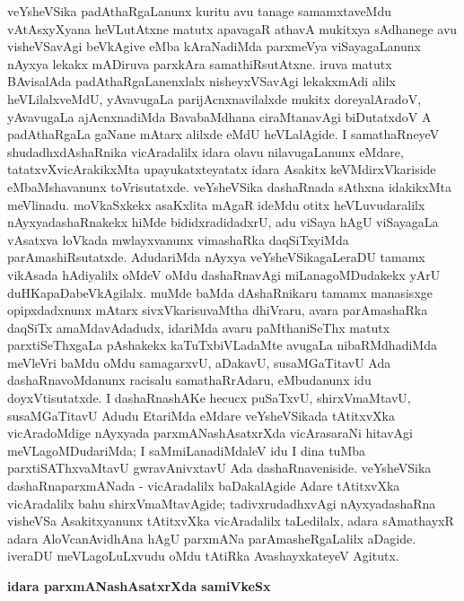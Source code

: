 veYsheVSika padAthaRgaLanunx kuritu avu tanage samamxtaveMdu vAtAsxyXyana heVLutAtxne matutx apavagaR athavA mukitxya sAdhanege avu visheVSavAgi beVkAgive eMba kAraNadiMda parxmeVya viSayagaLanunx nAyxya lekakx mADiruva parxkAra samathiRsutAtxne. iruva matutx BAvisalAda padAthaRgaLanenxlalx nisheyxVSavAgi lekakxmAdi alilx heVLilalxveMdU, yAvavugaLa parijAcnxnavilalxde mukitx doreyalAradoV, yAvavugaLa ajAcnxnadiMda BavabaMdhana ciraMtanavAgi biDutatxdoV A padAthaRgaLa gaNane mAtarx alilxde eMdU heVLalAgide. I samathaRneyeV shudadhxdAshaRnika vicAradalilx idara olavu nilavugaLanunx eMdare, tatatxvXvicArakikxMta upayukatxteyatatx idara Asakitx keVMdirxVkariside eMbaMshavanunx toVrisutatxde. veYsheVSika dashaRnada sAthxna idakikxMta meVlinadu. moVkaSxkekx asaKxlita mAgaR ideMdu otitx heVLuvudaralilx nAyxyadashaRnakekx hiMde bididxradidadxrU, adu viSaya hAgU viSayagaLa vAsatxva loVkada mwlayxvanunx vimashaRka daqSiTxyiMda parAmashiRsutatxde. AdudariMda nAyxya veYsheVSikagaLeraDU tamamx vikAsada hAdiyalilx oMdeV oMdu dashaRnavAgi miLanagoMDudakekx yArU duHKapaDabeVkAgilalx. muMde baMda dAshaRnikaru tamamx manasisxge opipxdadxnunx mAtarx sivxVkarisuvaMtha dhiVraru, avara parAmashaRka daqSiTx amaMdavAdadudx, idariMda avaru paMthaniSeThx matutx parxtiSeThxgaLa pAshakekx kaTuTxbiVLadaMte avugaLa nibaRMdhadiMda meVleVri baMdu oMdu samagarxvU, aDakavU, susaMGaTitavU Ada dashaRnavoMdanunx racisalu samathaRrAdaru, eMbudanunx idu doyxVtisutatxde. I dashaRnashAKe hecucx puSaTxvU, shirxVmaMtavU, susaMGaTitavU Adudu EtariMda eMdare veYsheVSikada tAtitxvXka vicAradoMdige nAyxyada parxmANashAsatxrXda vicArasaraNi hitavAgi meVLagoMDudariMda; I saMmiLanadiMdaleV idu I dina tuMba parxtiSAThxvaMtavU gwravAnivxtavU Ada dashaRnaveniside. veYsheVSika dashaRnaparxmANada - vicAradalilx baDakalAgide Adare tAtitxvXka vicAradalilx bahu shirxVmaMtavAgide; tadivxrudadhxvAgi nAyxyadashaRna visheVSa Asakitxyanunx tAtitxvXka vicAradalilx taLedilalx, adara sAmathayxR adara AloVcanAvidhAna hAgU parxmANa parAmasheRgaLalilx aDagide. iveraDU meVLagoLuLxvudu oMdu tAtiRka AvashayxkateyeV Agitutx.

\bigskip
\begin{center}
{\Large\bf idara parxmANashAsatxrXda samiVkeSx}
\end{center}

